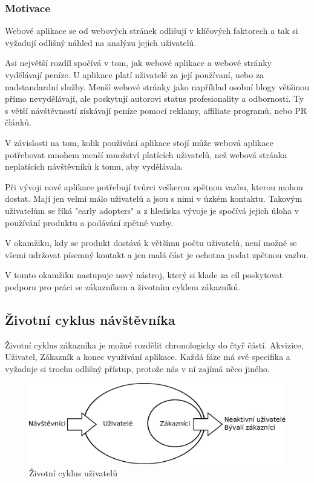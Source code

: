 \documentclass[bc,male,java,dept456]{diploma}						%
\begin{document}
\subsubsection{Motivace}

Webové aplikace se od webových stránek odlišují v klíčových faktorech a tak si vyžadují odlišný náhled na analýzu jejich uživatelů. 

Asi největší rozdíl spočívá v tom, jak webové aplikace a webové stránky vydělávají peníze. U aplikace platí uživatelé za její používaní, nebo za nadstandardní služby. Menší webové stránky jako například osobní blogy většinou přímo nevydělávají, ale poskytují autorovi status profesionality a odbornosti. Ty s větší návštěvností získávají peníze pomocí reklamy, affiliate programů, nebo PR článků.

V závislosti na tom, kolik používání aplikace stojí může webová aplikace potřebovat mnohem menší množství platících uživatelů, než webová stránka neplatících návštěvníků k tomu, aby vydělávala. 

Při vývoji nové aplikace potřebují tvůrci veškerou zpětnou vazbu, kterou mohou dostat. Mají jen velmi málo uživatelů a jsou s nimi v úzkém kontaktu. Takovým uživatelům se říká "early adopters" a z hlediska vývoje je spočívá jejich úloha v používání produktu a podávání zpětné vazby. 

V okamžiku, kdy se produkt dostává k většímu počtu uživatelů, není možné se všemi udržovat písemný kontakt a jen malá část je ochotna podat zpětnou vazbu. 

V tomto okamžiku nastupuje nový nástroj, který si klade za cíl poskytovat podporu pro práci se zákazníkem a životním cyklem zákazníků.


\subsection{Životní cyklus návštěvníka} %

Životní cyklus zákazníka je možné rozdělit chronologicky do čtyř částí. Akvizice, Uživatel, Zákazník a konec využívání aplikace. Každá fáze má své specifika a vyžaduje si trochu odlišný přístup, protože nás v ní zajímá něco jiného.

\begin{figure}[h]
	\centering
	\includegraphics[width=14cm]{img/user_lifecycle_slim.pdf}
	\caption{Životní cyklus uživatelů}
	\label{lifecycle}
\end{figure}
\end{document}
